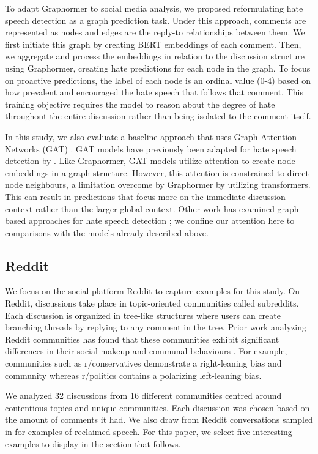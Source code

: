 \documentclass[letterpaper]{article} %
\newcommand{\todo}[1]{{#1}}
\begin{document}
To adapt Graphormer to social media analysis, we proposed reformulating hate speech detection as a graph prediction task. Under this approach, comments are represented as nodes and edges are the reply-to relationships between them. We first initiate this graph by creating BERT embeddings of each comment. Then, we aggregate and process the embeddings in relation to the discussion structure using Graphormer, creating hate predictions for each node in the graph. To focus on proactive predictions, the label of each node is an ordinal value (0-4) based on how prevalent and encouraged the hate speech that follows that comment. This training objective requires the model to reason about the degree of hate throughout the entire discussion rather than being isolated to the comment itself.  

In this study, we also evaluate a baseline approach that uses Graph Attention Networks (GAT) \cite{velickovic2018graph}. GAT models have previously been adapted for hate speech detection by \citet{parmentier2019learning, parmentier2021}. Like Graphormer, GAT models utilize attention to create node embeddings in a graph structure. However, this attention is constrained to direct node neighbours, a limitation overcome by Graphormer by utilizing transformers. This can result in predictions that focus more on the immediate discussion context rather than the larger global context.  Other work has examined graph-based approaches for hate speech detection \cite{mishra-etal-2019-abusive, tian-etal-2022-duck}; we confine our attention here to comparisons with the models already described above.

\subsection{Reddit}
We focus on the social platform Reddit to capture examples for this study. On Reddit, discussions take place in topic-oriented communities called subreddits. Each discussion is organized in tree-like structures where users can create branching threads by replying to any comment in the tree. Prior work analyzing Reddit communities has found that these communities exhibit significant differences in their social makeup and communal behaviours \cite{Waller2021}. For example, communities such as r/conservatives demonstrate a right-leaning bias and community whereas r/politics contains a polarizing left-leaning bias. 

We analyzed 32 discussions from 16 different communities centred around contentious topics and unique communities. Each discussion was chosen based on the amount of comments it had. We also draw from Reddit conversations sampled in \citet{kurrek2020towards} for examples of reclaimed speech. For this paper, we select five interesting examples to display in the section that follows.
\end{document}
